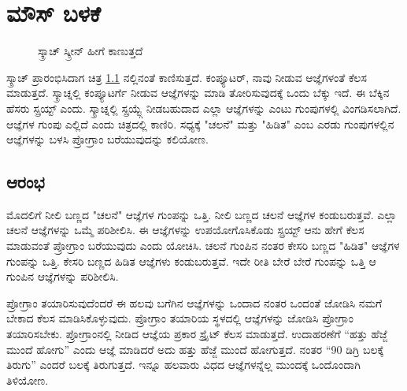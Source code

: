 \chapter{ಮೌಸ್ ಬಳಕೆ}

\begin{figure}[h]
\caption{ಸ್ಕ್ರಾಚ್ ಸ್ಕ್ರೀನ್ ಹೀಗೆ ಕಾಣುತ್ತದೆ}
\label{ScratchScreen}
\end{figure}

ಸ್ಕ್ರಾಚ್ ಪ್ರಾರಂಭಿಸಿದಾಗ ಚಿತ್ರ \ref{ScratchScreen} ನಲ್ಲಿನಂತೆ ಕಾಣಿಸುತ್ತದೆ. ಕಂಪ್ಯೂಟರ್, ನಾವು ನೀಡುವ ಆಜ್ಞೆಗಳಂತೆ ಕೆಲಸ ಮಾಡುತ್ತದೆ.  ಸ್ಕ್ರಾಚ್ನಲ್ಲಿ ಕಂಪ್ಯೂಟರ್ಗೆ ನೀಡುವ ಆಜ್ಞೆಗಳನ್ನು ಮಾಡಿ ತೋರಿಸುವುದಕ್ಕೆ ಒಂದು ಬೆಕ್ಕು ಇದೆ. ಈ ಬೆಕ್ಕಿನ ಹೆಸರು ಸ್ಪ್ರಯ್ಟ್ ಎಂದು. ಸ್ಕ್ರಾಚ್ನಲ್ಲಿ ಸ್ಪ್ರಯ್ಟ್ಗೆ ನೀಡಬಹುದಾದ ಎಲ್ಲಾ ಆಜ್ಞೆಗಳನ್ನು ಎಂಟು ಗುಂಪುಗಳಲ್ಲಿ ವಿಂಗಡಿಸಲಾಗಿದೆ.  ಆಜ್ಞೆಗಳ ಗುಂಪು ಎಲ್ಲಿದೆ ಎಂದು ಚಿತ್ರದಲ್ಲಿ ಕಾಣಿರಿ. ಸಧ್ಯಕ್ಕೆ "ಚಲನೆ" ಮತ್ತು "ಹಿಡಿತ" ಎಂಬ ಎರಡು ಗುಂಪುಗಳಲ್ಲಿನ  ಆಜ್ಞೆಗಳನ್ನು ಬಳಸಿ ಪ್ರೋಗ್ರಾಂ ಬರೆಯುವುದನ್ನು ಕಲಿಯೋಣ.
\section{ಆರಂಭ}

ಮೊದಲಿಗೆ ನೀಲಿ ಬಣ್ಣದ "ಚಲನೆ" ಆಜ್ಞೆಗಳ ಗುಂಪನ್ನು ಒತ್ತಿ.  ನೀಲಿ ಬಣ್ಣದ ಚಲನೆ ಆಜ್ಞೆಗಳ ಕಂಡುಬರುತ್ತವೆ.  ಎಲ್ಲಾ ಚಲನೆ ಆಜ್ಞೆಗಳನ್ನು ಒಮ್ಮೆ ಪರಿಶೀಲಿಸಿ. ಈ ಆಜ್ಞೆಗಳನ್ನು  ಉಪಯೋಗೊಸಿಕೊಡು ಸ್ಪ್ರಯ್ಟ್ ಆನು ಹೇಗೆ ಕೆಲಸ ಮಾಡುವಂತೆ ಪ್ರೋಗ್ರಾಂ ಬರೆಯುವುದು ಎಂದು ಯೋಚಿಸಿ.  ಚಲನೆ ಗುಂಪಿನ ನಂತರ ಕೇಸರಿ ಬಣ್ಣದ "ಹಿಡಿತ" ಆಜ್ಞೆಗಳ ಗುಂಪನ್ನು ಒತ್ತಿ.  ಕೇಸರಿ ಬಣ್ಣದ ಹಿಡಿತ ಆಜ್ಞೆಗಳು ಕಂಡುಬರುತ್ತವೆ.  ಇದೇ ರೀತಿ ಬೇರೆ ಬೇರೆ ಗುಂಪನ್ನು ಒತ್ತಿ ಆ ಗುಂಪಿನ ಆಜ್ಞೆಗಳನ್ನು ಪರಿಶೀಲಿಸಿ.

ಪ್ರೋಗ್ರಾಂ ತಯಾರಿಸುವುದೆಂದರೆ ಈ ಹಲವು ಬಗೆಗಿನ ಆಜ್ಞೆಗಳನ್ನು ಒಂದಾದ ನಂತರ ಒಂದಂತೆ ಜೋಡಿಸಿ ನಮಗೆ ಬೇಕಾದ ಕೆಲಸ ಮಾಡಿಸಿಕೊಳ್ಳುವುದು. ಪ್ರೋಗ್ರಾಂ ತಯಾರಿಯ ಸ್ಥಳದಲ್ಲಿ ಆಜ್ಞೆಗಳನ್ನು ಜೋಡಿಸಿ ಪ್ರೋಗ್ರಾಂ ತಯಾರಿಸಬೇಕು. ಪ್ರೋಗ್ರಾಂನಲ್ಲಿ ನೀಡಿದ ಆಜ್ಞೆಯ ಪ್ರಕಾರ ಸ್ಪ್ರೈಟ್ ಕೆಲಸ ಮಾಡುತ್ತದೆ. ಉದಾಹರಣೆಗೆ “ಹತ್ತು ಹೆಜ್ಜೆ ಮುಂದೆ ಹೋಗು” ಎಂದು ಆಜ್ಞೆ ಮಾಡಿದರೆ ಅದು ಹತ್ತು ಹೆಜ್ಜೆ ಮುಂದೆ ಹೋಗುತ್ತದೆ. ನಂತರ “90 ಡಿಗ್ರಿ ಬಲಕ್ಕೆ ತಿರುಗು” ಎಂದರೆ ಬಲಕ್ಕೆ ತಿರುಗುತ್ತದೆ. ಇನ್ನೂ ಹಲವಾರು ವಿಧದ ಆಜ್ಞೆಗಳನ್ನೆಲ್ಲ ಮುಂದಕ್ಕೆ ಒಂದೊಂದಾಗಿ ತಿಳಿಯೋಣ.

